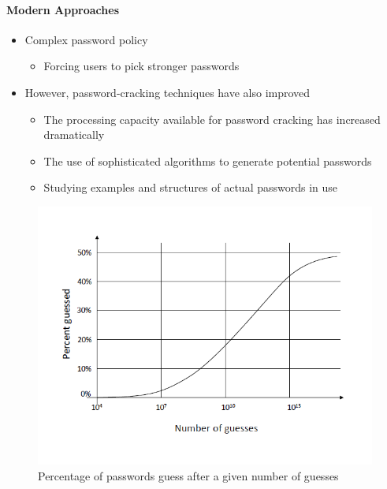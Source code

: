 \documentclass{article}
\begin{document}
            \paragraph{Modern Approaches}
            \begin{itemize}
                \item Complex password policy
                \begin{itemize}
                    \item Forcing users to pick stronger passwords
                \end{itemize}
                \item However, password-cracking techniques have also improved
                \begin{itemize}
                   \item The processing capacity available for password cracking has increased dramatically
                    \item The use of sophisticated algorithms to generate potential passwords
                    \item Studying examples and structures of actual passwords in use
                \end{itemize}
            \end{itemize}
            
            \begin{figure}[h]
                \begin{center}
                    \includegraphics{../immagini/percentage1.png}
                \end{center}
                \caption{Percentage of
                passwords
                guess after a
                given number
                of guesses}
            \end{figure}
\end{document}
